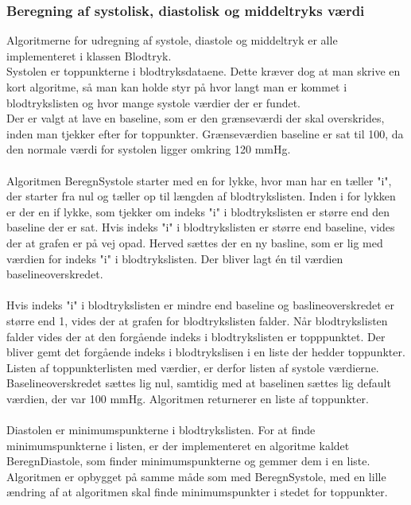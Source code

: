 \subsubsection{Beregning af systolisk, diastolisk og middeltryks værdi}
Algoritmerne for udregning af systole, diastole og middeltryk er alle implementeret i klassen Blodtryk. \\
Systolen er toppunkterne i blodtryksdataene. Dette kræver dog at man skrive en kort algoritme, så man kan holde styr på hvor langt man er kommet i blodtrykslisten og hvor mange systole værdier der er fundet.\\
Der er valgt at lave en baseline, som er den grænseværdi der skal overskrides, inden man tjekker efter for toppunkter.  Grænseværdien baseline er sat til 100, da den normale værdi for systolen ligger omkring 120 mmHg.  \\\\
Algoritmen BeregnSystole starter med en for lykke, hvor man har en tæller "i", der starter fra nul og tæller op til længden af blodtrykslisten. Inden i for lykken er der en if lykke, som tjekker om indeks "i" i blodtrykslisten er større end den baseline der er sat. Hvis indeks "i" i blodtrykslisten er større end baseline, vides der at grafen er på vej opad. Herved sættes der en ny basline, som er lig med værdien for indeks "i" i blodtrykslisten.  Der bliver lagt én til værdien baselineoverskredet.\\\\ 
Hvis indeks "i" i blodtrykslisten er mindre end baseline og baslineoverskredet er større end 1, vides der at grafen for blodtrykslisten falder. Når blodtrykslisten falder vides der at den forgående indeks i blodtrykslisten er topppunktet. Der bliver gemt det forgående indeks i blodtrykslisen i en liste der hedder toppunkter. Listen af toppunkterlisten med værdier, er derfor listen af systole værdierne. Baselineoverskredet sættes lig nul, samtidig med at baselinen sættes lig default værdien, der var 100 mmHg. Algoritmen returnerer en liste af toppunkter.\\\\
Diastolen er minimumspunkterne i blodtrykslisten. For at finde minimumspunkterne i listen, er der implementeret en algoritme kaldet BeregnDiastole, som finder minimumspunkterne og gemmer dem i en liste.\\
Algoritmen er opbygget på samme måde som med BeregnSystole, med en lille ændring af at algoritmen skal finde minimumspunkter i stedet for toppunkter.\\
